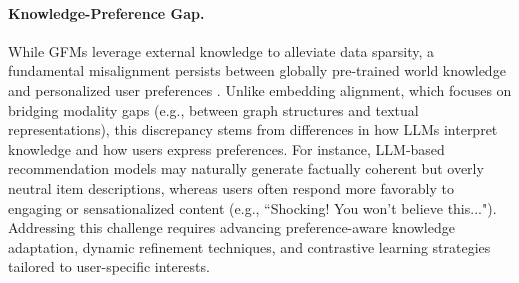\paragraph{Knowledge-Preference Gap.}
While GFMs leverage external knowledge to alleviate data sparsity, a fundamental misalignment persists between globally pre-trained world knowledge and personalized user preferences \cite{10.1145/3640457.3688161}. Unlike embedding alignment, which focuses on bridging modality gaps (e.g., between graph structures and textual representations), this discrepancy stems from differences in how LLMs interpret knowledge and how users express preferences. For instance, LLM-based recommendation models may naturally generate factually coherent but overly neutral item descriptions, whereas users often respond more favorably to engaging or sensationalized content (e.g., ``Shocking! You won’t believe this..."). Addressing this challenge requires advancing preference-aware knowledge adaptation, dynamic refinement techniques, and contrastive learning strategies tailored to user-specific interests.
